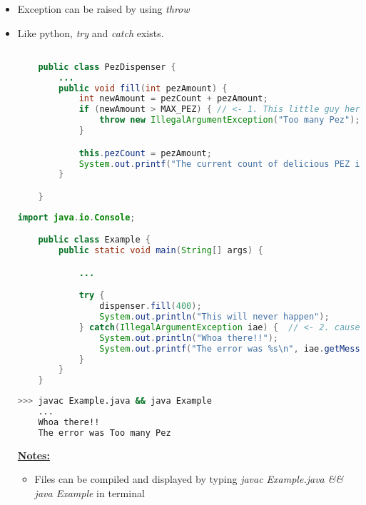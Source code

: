 \documentclass[12pt]{article}
\begin{document}
\begin{itemize}
    \item Exception can be raised by using \textit{throw}
    \item Like python, \textit{try} and \textit{catch} exists.


    \begin{lstlisting}[language=Java,caption={lesson\_9/PezDispenser.java}]

    public class PezDispenser {
        ...
        public void fill(int pezAmount) {
            int newAmount = pezCount + pezAmount;
            if (newAmount > MAX_PEZ) { // <- 1. This little guy here
                throw new IllegalArgumentException("Too many Pez");
            }

            this.pezCount = pezAmount;
            System.out.printf("The current count of delicious PEZ is %d\n", this.pezCount);
        }

    }
    \end{lstlisting}

    \begin{lstlisting}[language=Java,caption={lesson\_9/Example.java}]
    import java.io.Console;

    public class Example {
        public static void main(String[] args) {

            ...

            try {
                dispenser.fill(400);
                System.out.println("This will never happen");
            } catch(IllegalArgumentException iae) {  // <- 2. causes this exception to throw :)
                System.out.println("Whoa there!!");
                System.out.printf("The error was %s\n", iae.getMessage()); // 3. <- giving this message
            }
        }
    }
    \end{lstlisting}

    \begin{lstlisting}[language=bash,caption={Terminal}]
    >>> javac Example.java && java Example
    ...
    Whoa there!!
    The error was Too many Pez
    \end{lstlisting}

        \bigskip

        \underline{\textbf{Notes:}}

        \bigskip

        \begin{itemize}
            \item Files can be compiled and displayed by typing \textit{javac Example.java \&\& java Example}
            in terminal
        \end{itemize}

\end{itemize}
\end{document}
